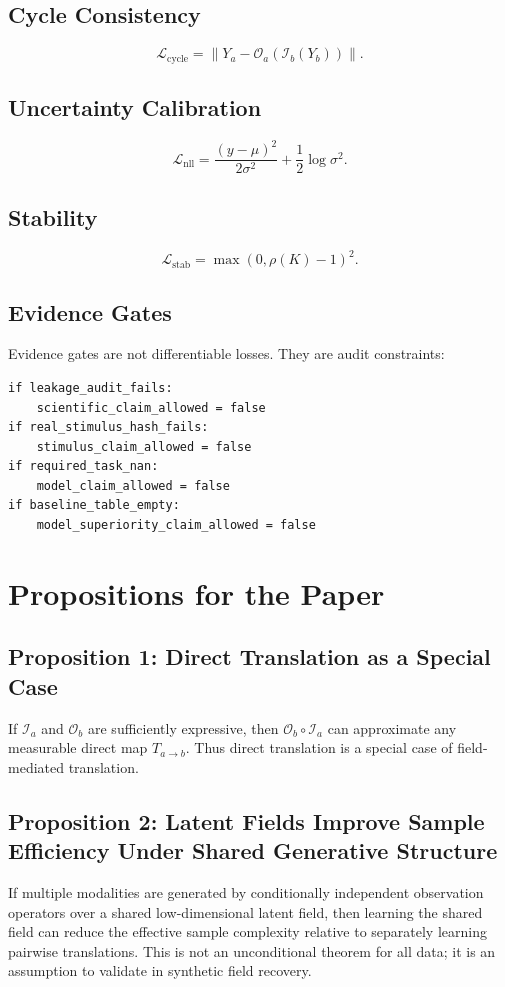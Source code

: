 \documentclass[11pt]{article}
\newcommand{\loss}{\mathcal{L}}
\newcommand{\Obs}{\mathcal{O}}
\newcommand{\Infer}{\mathcal{I}}
\begin{document}
\subsection{Cycle Consistency}
\begin{equation}
\loss_{\mathrm{cycle}}=\|Y_a-\Obs_a(\Infer_b(Y_b))\|.
\end{equation}

\subsection{Uncertainty Calibration}
\begin{equation}
\loss_{\mathrm{nll}}=\frac{(y-\mu)^2}{2\sigma^2}+\frac{1}{2}\log\sigma^2.
\end{equation}

\subsection{Stability}
\begin{equation}
\loss_{\mathrm{stab}}=\max(0,\rho(K)-1)^2.
\end{equation}

\subsection{Evidence Gates}
Evidence gates are not differentiable losses. They are audit constraints:
\begin{lstlisting}
if leakage_audit_fails:
    scientific_claim_allowed = false
if real_stimulus_hash_fails:
    stimulus_claim_allowed = false
if required_task_nan:
    model_claim_allowed = false
if baseline_table_empty:
    model_superiority_claim_allowed = false
\end{lstlisting}

\section{Propositions for the Paper}

\subsection{Proposition 1: Direct Translation as a Special Case}
If $\Infer_a$ and $\Obs_b$ are sufficiently expressive, then $\Obs_b\circ\Infer_a$ can approximate any measurable direct map $T_{a\rightarrow b}$. Thus direct translation is a special case of field-mediated translation.

\subsection{Proposition 2: Latent Fields Improve Sample Efficiency Under Shared Generative Structure}
If multiple modalities are generated by conditionally independent observation operators over a shared low-dimensional latent field, then learning the shared field can reduce the effective sample complexity relative to separately learning pairwise translations. This is not an unconditional theorem for all data; it is an assumption to validate in synthetic field recovery.
\end{document}
